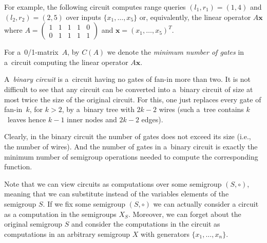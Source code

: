 \documentclass[11pt,letterpaper]{article}
\begin{document}
For example, the following circuit computes range queries $(l_1,r_1)=(1,4)$ and
$(l_2,r_2)=(2,5)$ over inputs $\{x_1, \dotsc, x_5\}$ or, equivalently, the
linear operator $A\mathbf{x}$ where
$A=\begin{pmatrix}1&1&1&1&0\\0&1&1&1&1\end{pmatrix}$ and
$\mathbf{x}=(x_1, \dotsc, x_5)^T$.

\begin{center}
\end{center}

For a~0/1-matrix~$A$, by $C(A)$ we denote the \emph{minimum number of gates} in
a~circuit computing the linear operator $A\mathbf{x}$.


A~{\em binary circuit} is a~circuit having no gates of fan-in more than two. It
is not difficult to see that any circuit can be converted into a~binary circuit
of size at most twice the size of the original circuit. For this, one just
replaces every gate of fan-in~$k$, for $k>2$, by a~binary tree with $2k-2$ wires
(such a~tree contains $k$~leaves hence $k-1$ inner nodes and $2k-2$ edges).

Clearly, in the binary circuit the number of gates does not exceed its size
(i.e., the number of wires). And the number of gates in a~binary circuit is
exactly the minimum number of semigroup operations needed to compute the
corresponding function.

Note that we can view circuits as computations over some semigroup $(S,\circ)$,
meaning that we can substitute instead of the variables elements of the
semigroup $S$. If we fix some semigroup $(S,\circ)$ we can actually consider a
circuit as a computation in the semigroups $X_S$. Moreover, we can forget about
the original semigroup $S$ and consider the computations in the circuit as
computations in an arbitrary semigroup $X$ with generators
$\{x_1, \ldots, x_n\}$.
\end{document}
